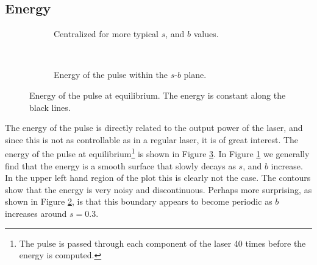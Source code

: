 \subsection{Energy}
\label{chap:energy}

\begin{figure}[p]
\centering
\begin{subfigure}{\textwidth}

\caption{Centralized for more typical $s$, and $b$ values.}
\label{fig:energyzoom}
\end{subfigure} \\
\begin{subfigure}{\textwidth}

\caption{Energy of the pulse within the $s$-$b$ plane.}
\label{fig:energybig}
\end{subfigure}
\caption{Energy of the pulse at equilibrium. The energy is constant along the black lines.}
\label{fig:energy}
\end{figure}

The energy of the pulse is directly related to the output power of the laser, and since this is not as controllable as in a regular laser, it is of great interest. The energy of the pulse at equilibrium\footnote{The pulse is passed through each component of the laser 40 times before the energy is computed.} is shown in Figure \ref{fig:energy}. In Figure \ref{fig:energyzoom} we generally find that the energy is a smooth surface that slowly decays as $s$, and $b$ increase. In the upper left hand region of the plot this is clearly not the case. The contours show that the energy is very noisy and discontinuous. Perhaps more surprising, as shown in Figure \ref{fig:energybig}, is that this boundary appears to become periodic as $b$ increases around $s = 0.3$. \\


